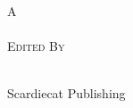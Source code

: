 \begin{titlepage}
\HRule
\begin{center}
\textsc{\Large A}\\[1cm]
\textsc{\Huge \titel}\\[2cm]
\textsc{\Large Edited By}\\[1.5cm]
\textsc{\huge \autor}\\[0.5cm]
\HRule 


\vfill 
\small\sffamily Scardiecat Publishing\par 
\end{center}
\end{titlepage}
